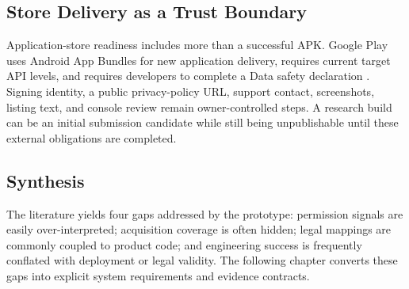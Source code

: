 \subsection{Store Delivery as a Trust Boundary}

Application-store readiness includes more than a successful APK. Google Play uses Android App Bundles for new application delivery, requires current target API levels, and requires developers to complete a Data safety declaration \cite{androidbundle2026,playtarget2026,playdatasafety2026}. Signing identity, a public privacy-policy URL, support contact, screenshots, listing text, and console review remain owner-controlled steps. A research build can be an initial submission candidate while still being unpublishable until these external obligations are completed.

\subsection{Synthesis}

The literature yields four gaps addressed by the prototype: permission signals are easily over-interpreted; acquisition coverage is often hidden; legal mappings are commonly coupled to product code; and engineering success is frequently conflated with deployment or legal validity. The following chapter converts these gaps into explicit system requirements and evidence contracts.
